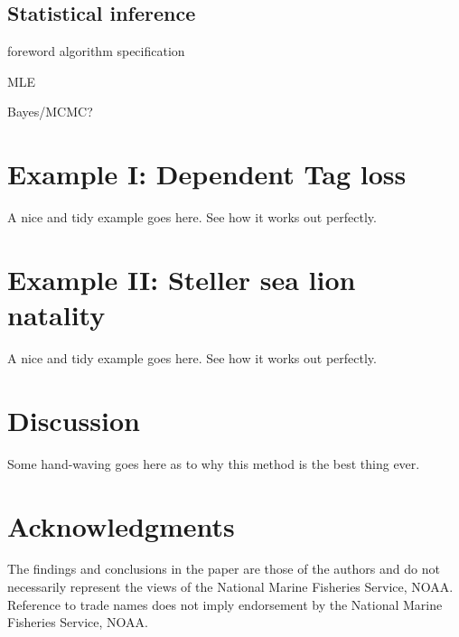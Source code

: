 \documentclass[fleqn]{article}
\begin{document}
\subsection{Statistical inference}

foreword algorithm specification

MLE

Bayes/MCMC?

\section{Example I: Dependent Tag loss}

A nice and tidy example goes here. See how it works out perfectly.

\section{Example II: Steller sea lion natality}

A nice and tidy example goes here. See how it works out perfectly.

\section{Discussion}

Some hand-waving goes here as to why this method is the best thing ever.


\section*{Acknowledgments}
The findings and conclusions in the paper are those of the authors and do not necessarily represent the views of the National Marine Fisheries Service, NOAA. Reference to trade names does not imply endorsement by the National Marine Fisheries Service, NOAA.

\renewcommand{\baselinestretch}{1}\normalsize



\clearpage


\renewcommand{\arraystretch}{1.33}
\end{document}
